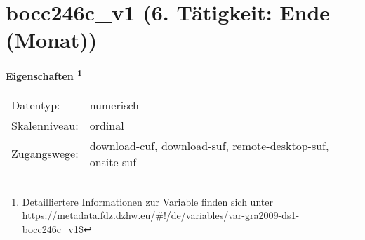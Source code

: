 
    \setcounter{footnote}{0}

    \vspace*{-1.8cm}
	\section{bocc246c\_v1 (6. Tätigkeit: Ende (Monat))}
	\label{section:bocc246c_v1}



    \vspace*{0.5cm}
    \noindent\textbf{Eigenschaften
	\footnote{Detailliertere Informationen zur Variable finden sich unter
		\url{https://metadata.fdz.dzhw.eu/\#!/de/variables/var-gra2009-ds1-bocc246c_v1$}}}\\
	\begin{tabularx}{\hsize}{@{}lX}
	Datentyp: & numerisch \\
	Skalenniveau: & ordinal \\
	Zugangswege: &
	  download-cuf, 
	  download-suf, 
	  remote-desktop-suf, 
	  onsite-suf
 \\
    \end{tabularx}



